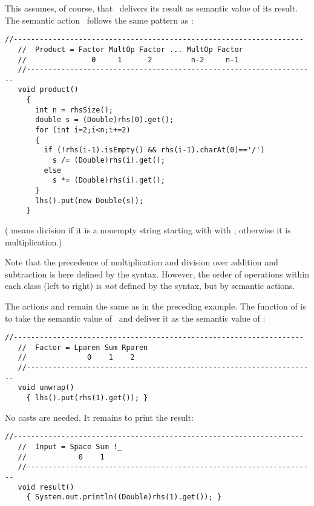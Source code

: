 This assumes, of course, that \Product\ delivers its result as semantic value
of its result.
The semantic action \Producta\ follows the same pattern as \Suma:

\small
\begin{Verbatim}[frame=single,framesep=2mm,samepage=true,xleftmargin=15mm,xrightmargin=15mm,baselinestretch=0.8]
   //-------------------------------------------------------------------
   //  Product = Factor MultOp Factor ... MultOp Factor 
   //               0     1      2         n-2     n-1
   //-------------------------------------------------------------------
   void product()
     {        
       int n = rhsSize();
       double s = (Double)rhs(0).get();
       for (int i=2;i<n;i+=2)
       {
         if (!rhs(i-1).isEmpty() && rhs(i-1).charAt(0)=='/')
           s /= (Double)rhs(i).get();
         else  
           s *= (Double)rhs(i).get();
       }  
       lhs().put(new Double(s));
     }
\end{Verbatim}
\normalsize

( 
means division if it is a nonempty string starting with with ;
otherwise it is multiplication.)

Note that the precedence of multiplication and division 
over addition and subtraction is here defined by the syntax.
However, the order of operations within each class (left to right)
is \emph{not} defined by the syntax, but by semantic actions.

The actions  and  
remain the same as in the preceding example.
The function of  is to take the semantic value of \Sum\
and deliver it as the semantic value of \Factor:

\small
\begin{Verbatim}[frame=single,framesep=2mm,samepage=true,xleftmargin=15mm,xrightmargin=15mm,baselinestretch=0.8]
   //-------------------------------------------------------------------
   //  Factor = Lparen Sum Rparen 
   //              0    1    2
   //-------------------------------------------------------------------
   void unwrap()
     { lhs().put(rhs(1).get()); }
\end{Verbatim}
\normalsize

No casts are needed.
It remains to print the result:

\small
\begin{Verbatim}[frame=single,framesep=2mm,samepage=true,xleftmargin=15mm,xrightmargin=15mm,baselinestretch=0.8]
   //-------------------------------------------------------------------
   //  Input = Space Sum !_
   //            0    1
   //-------------------------------------------------------------------
   void result()
     { System.out.println((Double)rhs(1).get()); }
\end{Verbatim}
\normalsize

